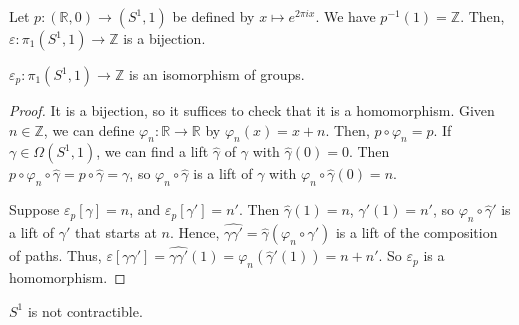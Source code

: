 \begin{example}
	Let \( p \colon (\mathbb R, 0) \to (S^1, 1) \) be defined by \( x \mapsto e^{2 \pi i x} \).
	We have \( p^{-1}(1) = \mathbb Z \).
	Then, \( \varepsilon \colon \pi_1(S^1, 1) \to \mathbb Z \) is a bijection.
\end{example}
\begin{theorem}
	\( \varepsilon_p \colon \pi_1(S^1, 1) \to \mathbb Z \) is an isomorphism of groups.
\end{theorem}
\begin{proof}
	It is a bijection, so it suffices to check that it is a homomorphism.
	Given \( n \in \mathbb Z \), we can define \( \varphi_n \colon \mathbb R \to \mathbb R \) by \( \varphi_n(x) = x + n \).
	Then, \( p \circ \varphi_n = p \).
	If \( \gamma \in \Omega(S^1, 1) \), we can find a lift \( \hat \gamma \) of \( \gamma \) with \( \hat \gamma(0) = 0 \).
	Then \( p \circ \varphi_n \circ \hat \gamma = p \circ \hat \gamma = \gamma \), so \( \varphi_n \circ \hat \gamma \) is a lift of \( \gamma \) with \( \varphi_n \circ \hat \gamma(0) = n \).

	Suppose \( \varepsilon_p[\gamma] = n \), and \( \varepsilon_p[\gamma'] = n' \).
	Then \( \hat\gamma(1) = n \), \( \hat\gamma'(1) = n' \), so \( \varphi_n \circ \hat \gamma' \) is a lift of \( \gamma' \) that starts at \( n \).
	Hence, \( \widehat{\gamma\gamma'} = \hat \gamma (\varphi_n \circ \hat \gamma') \) is a lift of the composition of paths.
	Thus, \( \varepsilon[\gamma\gamma'] = \widehat{\gamma\gamma'}(1) = \varphi_n(\hat\gamma'(1)) = n + n' \).
	So \( \varepsilon_p \) is a homomorphism.
\end{proof}
\begin{corollary}
	\( S^1 \) is not contractible.
\end{corollary}

